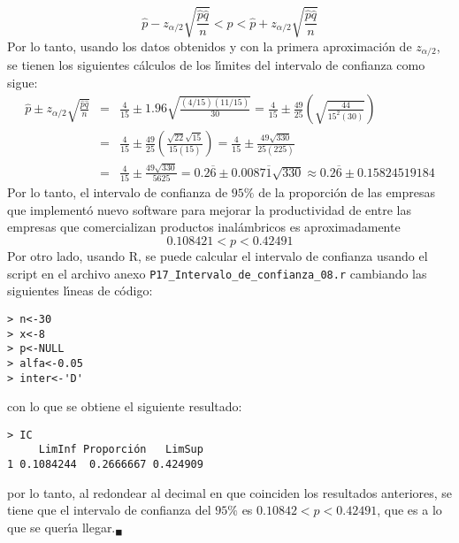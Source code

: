 \begin{solucion}
 \begin{equation*}
  \hat{p} - z_{\alpha/2}\sqrt{\frac{\hat{p}\hat{q}}{n}} < p < \hat{p} + z_{\alpha/2}\sqrt{\frac{\hat{p}\hat{q}}{n}}
 \end{equation*}
 Por lo tanto, usando los datos obtenidos y con la primera aproximaci\'on de $z_{\alpha/2}$, se tienen los siguientes c\'alculos de los l\'{\i}mites del intervalo de confianza como sigue:
 \begin{eqnarray*}
  \hat{p} \pm z_{\alpha/2}\sqrt{\frac{\hat{p}\hat{q}}{n}} & = & \frac{4}{15} \pm 1.96\sqrt{\frac{(4/15)(11/15)}{30}} = \frac{4}{15} \pm \frac{49}{25} \left( \sqrt{\frac{44}{15^2(30)}} \right) \\
  & = & \frac{4}{15} \pm \frac{49}{25} \left( \frac{\sqrt{22}\sqrt{15}}{15(15)} \right) = \frac{4}{15} \pm \frac{49\sqrt{330}}{25(225)} \\
  & = & \frac{4}{15} \pm \frac{49\sqrt{330}}{5625} = 0.2\overline{6} \pm 0.0087\overline{1}\sqrt{330} \approx 0.2\overline{6} \pm 0.15824519184
 \end{eqnarray*}
 Por lo tanto, el intervalo de confianza de $95\%$ de la proporci\'on de las empresas que implement\'o nuevo software para mejorar la productividad de entre las empresas que comercializan productos inal\'ambricos es aproximadamente
 \begin{equation*}
  0.108421 < p < 0.42491
 \end{equation*}
 Por otro lado, usando R, se puede calcular el intervalo de confianza usando el script en el archivo anexo \texttt{P17\_Intervalo\_de\_confianza\_08.r} cambiando las siguientes l\'{\i}neas de c\'odigo:
 \begin{verbatim}
> n<-30
> x<-8
> p<-NULL
> alfa<-0.05
> inter<-'D'
 \end{verbatim}
 \vspace{-0.5cm}
 con lo que se obtiene el siguiente resultado:
 \begin{verbatim}
> IC
     LimInf Proporción   LimSup
1 0.1084244  0.2666667 0.424909
 \end{verbatim}
 \vspace{-0.5cm}
 por lo tanto, al redondear al decimal en que coinciden los resultados anteriores, se tiene que el intervalo de confianza del $95\%$ es $0.10842 < p < 0.42491$, que es a lo que se quer\'{\i}a llegar.${}_{\blacksquare}$
\end{solucion}
